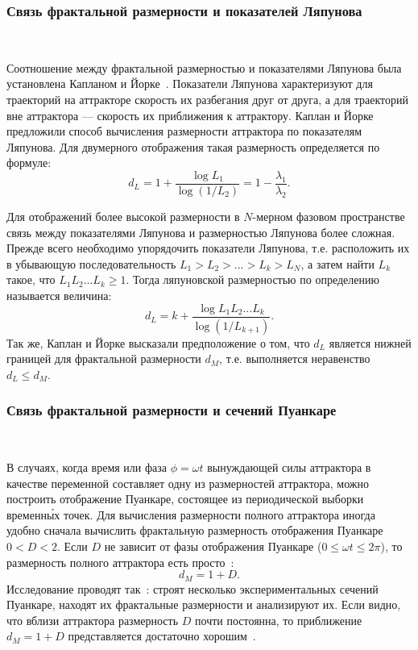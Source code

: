\subsubsection{Связь фрактальной размерности и показателей Ляпунова}
~\par
Соотношение между фрактальной размерностью и показателями Ляпунова была установлена Капланом и Йорке~\cite{KAPLAN_AND_YORKE}. Показатели Ляпунова характеризуют для траекторий на аттракторе скорость их разбегания друг от друга, а для траекторий вне аттрактора --- скорость их приближения к аттрактору. Каплан и Йорке~\cite{KAPLAN_AND_YORKE} предложили способ вычисления размерности аттрактора по показателям Ляпунова. Для двумерного отображения такая размерность определяется по формуле:
$$
	d_L = 1 + \frac{   \log{L_1}   }{   \log{(1/L_2)}   } = 1 - \frac{\lambda_1}{\lambda_2}.
$$

Для отображений более высокой размерности в $N$-мерном фазовом пространстве связь между показателями Ляпунова и размерностью Ляпунова более сложная. Прежде всего необходимо упорядочить показатели Ляпунова, т.е. расположить их в убывающую последовательность $L_1 > L_2 > ... > L_k > L_N$, а затем найти $L_k$ такое, что $L_1L_2...L_k \ge 1$. Тогда ляпуновской размерностью по определению называется величина:
$$
	d_L = k + \frac{   \log{L_1L_2...L_k}   }{   \log{(1/L_{k+1})}   }.
$$
Так же, Каплан и Йорке высказали предположение о том, что $d_L$ является нижней границей для фрактальной размерности $d_M$, т.е. выполняется неравенство $d_L \le d_M$.~\cite{Mun}

\subsubsection{Связь фрактальной размерности и сечений Пуанкаре}
~\par
В случаях, когда время или фаза $\phi = \omega t$ вынуждающей силы аттрактора в качестве переменной составляет одну из размерностей аттрактора, можно построить отображение Пуанкаре, состоящее из периодической выборки временн\'{ы}х точек. Для вычисления размерности полного аттрактора иногда удобно сначала вычислить фрактальную размерность отображения Пуанкаре $0 < D < 2$. Если $D$ не зависит от фазы отображения Пуанкаре ($0 \le \omega t \le 2\pi$), то размерность полного аттрактора есть просто~\cite{Mun}: 
$$
	d_M = 1 + D.
$$
Исследование проводят так~\cite{Mun}: строят несколько экспериментальных сечений Пуанкаре, находят их фрактальные размерности и анализируют их. Если видно, что вблизи аттрактора размерность $D$ почти постоянна, то приближение $d_M = 1 + D$ представляется достаточно хорошим~\cite{Mun}.

